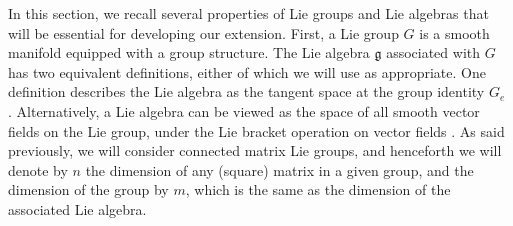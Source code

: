 
In this section, we recall several properties of Lie groups and Lie algebras that will be essential for developing our extension. First, a Lie group $G$ is a smooth manifold equipped with a group structure. The Lie algebra $\mathfrak{g}$ associated with $G$ has two equivalent definitions, either of which we will use as appropriate. One definition describes the Lie algebra as the tangent space at the group identity $G_e$ \citep[p. 16]{Gallier2020}. Alternatively, a Lie algebra can be viewed as the space of all smooth vector fields on the Lie group, under the Lie bracket operation on vector fields \citep[p. 190]{Lee2012}. As said previously, we will consider connected matrix Lie groups, and henceforth we will denote by $n$ the dimension of any (square) matrix in a given group, and the dimension of the group by $m$, which is the same as the dimension of the associated Lie algebra.

